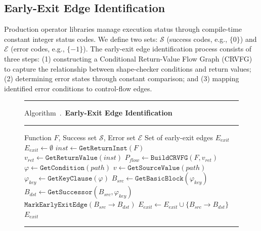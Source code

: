 \subsection{Early-Exit Edge Identification}\label{sec:design:early-return}

Production operator libraries manage execution status through compile-time constant integer status codes.
We define two sets: $\mathcal{S}$ (success codes, e.g., $\{0\}$) and $\mathcal{E}$ (error codes, e.g., $\{-1\}$).
The early-exit edge identification process consists of three steps: (1) constructing a Conditional Return-Value Flow Graph (CRVFG) to capture the relationship between shape-checker conditions and return values; (2) determining error states through constant comparison; and (3) mapping identified error conditions to control-flow edges.

\begin{figure}[t]
	\centering
	\begin{minipage}[b]{0.48\linewidth}
		\centering
		\resizebox{\linewidth}{!}{%
		
		}
		\label{fig:conditional-value-flow}
	\end{minipage}%
	\hfill
	\begin{minipage}[b]{0.48\linewidth}
		\centering
		\vspace{2pt}
		\hrule
		\vspace{2pt}
		\label{algo:early-exit-identification}
		{\small Algorithm~\thealgorithm.\ \textbf{Early-Exit Edge Identification}\par}
		\vspace{2pt}
		\hrule
		\vspace{2pt}
		\begin{algorithmic}[1]
			\Require Function $F$, Success set $\mathcal{S}$, Error set $\mathcal{E}$
			\Ensure Set of early-exit edges $E_{exit}$
			\State $E_{exit} \gets \emptyset$
			\State $inst \gets \texttt{GetReturnInst}(F)$
			\State $v_{ret} \gets \texttt{GetReturnValue}(inst)$
			\State $P_{flow} \gets \texttt{BuildCRVFG}(F, v_{ret})$
				\State $\varphi \gets \texttt{GetCondition}(path)$
				\State $v \gets \texttt{GetSourceValue}(path)$
					\State $\varphi_{key} \gets \texttt{GetKeyClause}(\varphi)$
					\State $B_{src} \gets \texttt{GetBasicBlock}(\varphi_{key})$
					\State $B_{dst} \gets \texttt{GetSuccessor}(B_{src}, \varphi_{key})$
					\State $\texttt{MarkEarlyExitEdge}(B_{src} \rightarrow B_{dst})$
					\State $E_{exit} \gets E_{exit} \cup \{B_{src} \rightarrow B_{dst}\}$
				\EndIf
			\EndFor
			\State \Return $E_{exit}$
		\end{algorithmic}
		\vspace{2pt}
		\hrule
	\end{minipage}
\end{figure}

